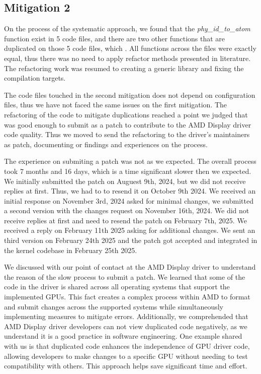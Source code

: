 \subsection{Mitigation 2}

On the process of the systematic approach, we found that the \textit{phy\_id\_to\_atom} function exist in 5 code files, and 
there are two other functions that are duplicated on those 5 code files, which . All functions across the files were
exactly equal, thus there was no need to apply refactor methods presented in literature. The refactoring work was resumed
to creating a generic library and fixing the compilation targets. 

The code files touched in the second mitigation does 
not depend on configuration files, thus we have not faced the same issues on the first mitigation. 
The refactoring of the code to mitigate duplications reached a point we judged that was good enough to submit as a patch
to contribute to the AMD Display driver code quality. Thus we moved to send the refactoring to the driver's maintainers 
as patch, documenting or findings and experiences on the process.


The experience on submiting a patch was not as we expected.
The overall process took 7 months and 16 days, which is a time significant slower then we expected.
We initially submitted the patch on Auguest 9th, 2024, but we did not receive replies at first. Thus, we had
to to resend it on October 9th 2024. We received an initial response on November 3rd, 2024 asked for minimal changes, 
we submitted a second version with the changes request on November 16th, 2024. We did not receive replies
at first and need to resend the patch on February 7th, 2025. 
We received a reply on February 11th 2025 asking for additional changes. 
We sent an third version on February 24th 2025 and the patch got accepted and integrated in the kernel codebase in 
February 25th 2025.

We discussed with our point of contact at the AMD Display driver to understand the reason of the slow process
to submit a patch. 
We learned that some of the code in the driver is shared across all operating systems that 
support the implemented GPUs. 
This fact creates a complex process within AMD to format and submit changes across the supported systems while 
simultaneously implementing measures to mitigate errors.
Additionally, we comprehended that AMD Display driver developers can not view duplicated code negatively, 
as we understand it is a good practice in software engineering. One example shared with us is that duplicated 
code enhances the independence of GPU driver code, allowing developers to make changes to a specific GPU without 
needing to test compatibility with others. This approach helps save significant time and effort. 

